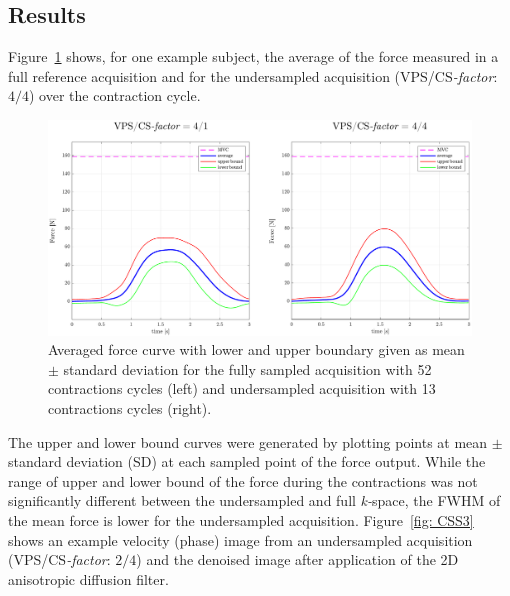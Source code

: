 \subsection{Results}
Figure~\ref{fig: CSS2} shows, for one example subject, the average of the force measured in a full reference acquisition and for the undersampled acquisition (VPS/\mbox{CS\textit{-factor}}: $4/4$) over the contraction cycle. 
\begin{figure}[!htb]
\vspace{+0.2cm}
\centering
\includegraphics[width=\textwidth]{Figures/CS1_4.pdf}
\caption[Averaged force curve for the fully sampled acquisition and undersampled acquisition]{Averaged force curve with lower and upper boundary given as mean $\pm$ standard deviation for the fully sampled acquisition with 52 contractions cycles (left) and undersampled acquisition with 13 contractions cycles (right).}
\label{fig: CSS2}
\end{figure}
The upper and lower bound curves were generated by plotting points at mean $\pm$ standard deviation (SD) at each sampled point of the force output. 
While the range of upper and lower bound of the force during the contractions was not significantly different between the undersampled and full \mbox{\textit{k-}space}, the FWHM of the mean force is lower for the undersampled acquisition. 
Figure~\ref{fig: CSS3} shows an example velocity (phase) image from an undersampled acquisition (VPS/\mbox{CS\textit{-factor}}: $2/4$) and the denoised image after application of the 2D anisotropic diffusion filter. 
